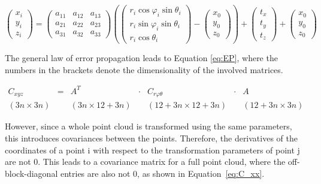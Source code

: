 \documentclass[preprint,12pt,3p]{elsarticle}
\begin{document}
\begin{equation}
    \begin{pmatrix}
    x_i \\
    y_i \\
    z_i 
    \end{pmatrix} = 
    \begin{pmatrix}
    a_{11} & a_{12} & a_{13} \\
    a_{21} & a_{22} & a_{23} \\
    a_{31} & a_{32} & a_{33} 
    \end{pmatrix}
    \left(
    \begin{pmatrix}
        r_i \cos{\varphi_i} \sin{\theta_i}\\
        r_i \sin{\varphi_i} \sin{\theta_i}\\
        r_i \cos{\theta_i}
    \end{pmatrix}
    -
    \begin{pmatrix}
    x_0 \\
    y_0 \\
    z_0
    \end{pmatrix}
    \right)
    +
    \begin{pmatrix}
    t_x \\
    t_y \\
    t_z
    \end{pmatrix}
    + 
    \begin{pmatrix}
    x_0 \\
    y_0 \\
    z_0
    \end{pmatrix}
    \label{eq:obs_ICP}
\end{equation}

The general law of error propagation \citep{gum} leads to Equation \ref{eq:EP}, where the numbers in the brackets denote the dimensionality of the involved matrices.

\begin{equation}
\begin{matrix}
C_{xyz} & = & A^T & \cdot &  C_{r\varphi\theta} & \cdot & A \\
(3n \times 3n) & & (3n \times 12+3n) & & (12+3n \times 12+3n) & & (12+3n \times 3n)
\end{matrix}
\label{eq:EP}
\end{equation}

However, since a whole point cloud is transformed using the same parameters, this introduces covariances between the points. Therefore, the derivatives of the coordinates of a point i with respect to the transformation parameters of point j are not 0. This leads to a covariance matrix for a full point cloud, where the off-block-diagonal entries are also not 0, as shown in Equation~\ref{eq:C_xx}.
\end{document}
